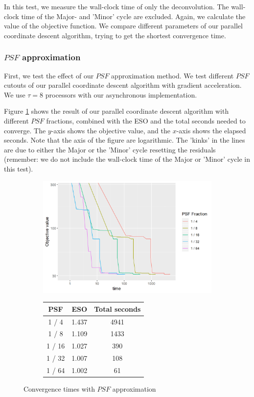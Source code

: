 In this test, we measure the wall-clock time of only the deconvolution. The wall-clock time of the Major- and 'Minor' cycle are excluded. Again, we calculate the value of the objective function. We compare different parameters of our parallel coordinate descent algorithm, trying to get the shortest convergence time.

\subsubsection{$PSF$ approximation}
First, we test the effect of our $PSF$ approximation method. We test different $PSF$ cutouts of our parallel coordinate descent algorithm with gradient acceleration. We use $\tau = 8$ processors with our asynchronous implementation.

Figure \ref{pcdm:results:psf} shows the result of our parallel coordinate descent algorithm with different $PSF$ fractions, combined with the ESO and the total seconds needed to converge. The $y$-axis shows the objective value, and the $x$-axis shows the elapsed seconds. Note that the axis of the figure are logarithmic. The 'kinks' in the lines are due to either the Major or the 'Minor' cycle resetting the residuals (remember: we do not include the wall-clock time of the Major or 'Minor' cycle in this test).

\begin{figure}[h]
	\centering
	\begin{subfigure}{0.6\linewidth}
		\includegraphics[width=1.0\linewidth]{./chapters/05.pcdm/parameters/psfSize.png}
	\end{subfigure}
	\begin{subfigure}{0.35\linewidth}
		\begin{tabular}{c | c | c}
			PSF & ESO & Total seconds \\ \hline
			1 / 4 & 1.437 & 4941 \\
			1 / 8 & 1.109 & 1433 \\
			1 / 16 & 1.027 & 390 \\
			1 / 32 & 1.007 & 108 \\
			1 / 64 & 1.002 & 61 \\
		\end{tabular}
	\end{subfigure}
	\caption{Convergence times with $PSF$ approximation}
	\label{pcdm:results:psf}
\end{figure}

